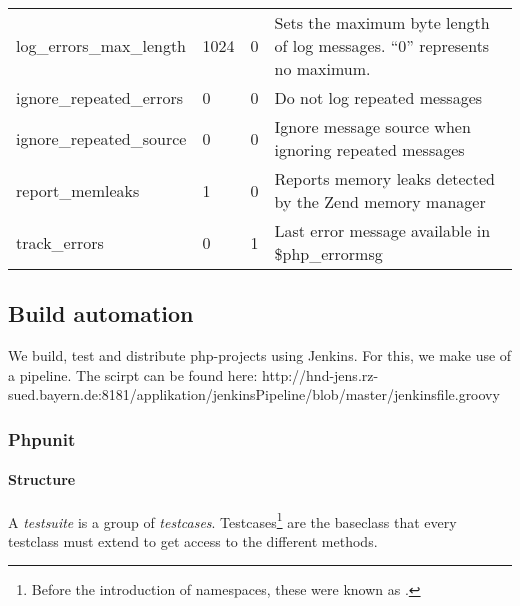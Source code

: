 \begin{table}[ht]
\begin{tabular}{@{}llll@{}}
log\_errors\_max\_length & 1024            & 0                                   & Sets the maximum byte length of log messages. “0” represents no maximum.                                                           \\
ignore\_repeated\_errors & 0               & 0                                   & Do not log repeated messages                                                                                                       \\
ignore\_repeated\_source & 0               & 0                                   & Ignore message source when ignoring repeated messages                                                                              \\
report\_memleaks         & 1               & 0                                   & Reports memory leaks detected by the Zend memory manager                                                                           \\
track\_errors            & 0               & 1                                   & Last error message available in \$php\_errormsg                                                                                    \\ \bottomrule
\end{tabular}
\end{table}


\subsection{Build automation}

We build, test and distribute php-projects using Jenkins. For this, we make use of a pipeline. The scirpt can be found here: http://hnd-jens.rz-sued.bayern.de:8181/applikation/jenkinsPipeline/blob/master/jenkinsfile.groovy





\subsubsection{Phpunit}

\paragraph{Structure} A \emph{testsuite} is a group of \emph{testcases}. Testcases\footnote{Before the introduction of namespaces, these were known as .} are the baseclass that every testclass must extend to get access to the different  methods. 

